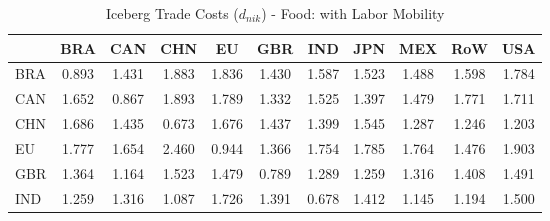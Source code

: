 \begin{table}[htbp]
\centering
\caption{Iceberg Trade Costs ($d_{nik}$) - Food: with Labor Mobility} 
\label{tab:iceberg_Food}
\begin{tabular}{lcccccccccc}
  \hline
 & BRA & CAN & CHN & EU & GBR & IND & JPN & MEX & RoW & USA \\ 
  \hline
BRA & \textcolor[RGB]{235,152,20}{0.893} & \textcolor[RGB]{150,97,105}{1.431} & \textcolor[RGB]{18,12,237}{1.883} & \textcolor[RGB]{23,15,232}{1.836} & \textcolor[RGB]{153,99,102}{1.430} & \textcolor[RGB]{82,53,173}{1.587} & \textcolor[RGB]{99,64,156}{1.523} & \textcolor[RGB]{120,78,135}{1.488} & \textcolor[RGB]{79,51,176}{1.598} & \textcolor[RGB]{33,21,222}{1.784} \\ 
  CAN & \textcolor[RGB]{66,43,189}{1.652} & \textcolor[RGB]{240,155,15}{0.867} & \textcolor[RGB]{15,10,240}{1.893} & \textcolor[RGB]{28,18,227}{1.789} & \textcolor[RGB]{191,124,64}{1.332} & \textcolor[RGB]{97,63,158}{1.525} & \textcolor[RGB]{171,111,84}{1.397} & \textcolor[RGB]{125,81,130}{1.479} & \textcolor[RGB]{38,25,217}{1.771} & \textcolor[RGB]{51,33,204}{1.711} \\ 
  CHN & \textcolor[RGB]{54,35,201}{1.686} & \textcolor[RGB]{148,96,107}{1.435} & \textcolor[RGB]{252,163,3}{0.673} & \textcolor[RGB]{61,40,194}{1.676} & \textcolor[RGB]{145,94,110}{1.437} & \textcolor[RGB]{166,107,89}{1.399} & \textcolor[RGB]{94,61,161}{1.545} & \textcolor[RGB]{207,134,48}{1.287} & \textcolor[RGB]{214,139,41}{1.246} & \textcolor[RGB]{217,140,38}{1.203} \\ 
  EU & \textcolor[RGB]{36,23,219}{1.777} & \textcolor[RGB]{64,41,191}{1.654} & \textcolor[RGB]{0,0,255}{2.460} & \textcolor[RGB]{230,148,26}{0.944} & \textcolor[RGB]{178,115,76}{1.366} & \textcolor[RGB]{43,28,212}{1.754} & \textcolor[RGB]{31,20,224}{1.785} & \textcolor[RGB]{41,26,214}{1.764} & \textcolor[RGB]{130,84,125}{1.476} & \textcolor[RGB]{13,8,242}{1.903} \\ 
  GBR & \textcolor[RGB]{181,117,74}{1.364} & \textcolor[RGB]{222,144,33}{1.164} & \textcolor[RGB]{102,66,153}{1.523} & \textcolor[RGB]{128,82,128}{1.479} & \textcolor[RGB]{245,158,10}{0.789} & \textcolor[RGB]{204,132,51}{1.289} & \textcolor[RGB]{209,135,46}{1.259} & \textcolor[RGB]{196,127,59}{1.316} & \textcolor[RGB]{163,106,92}{1.408} & \textcolor[RGB]{117,76,138}{1.491} \\ 
  IND & \textcolor[RGB]{212,137,43}{1.259} & \textcolor[RGB]{199,129,56}{1.316} & \textcolor[RGB]{227,147,28}{1.087} & \textcolor[RGB]{48,31,207}{1.726} & \textcolor[RGB]{173,112,82}{1.391} & \textcolor[RGB]{250,162,5}{0.678} & \textcolor[RGB]{161,104,94}{1.412} & \textcolor[RGB]{224,145,31}{1.145} & \textcolor[RGB]{219,142,36}{1.194} & \textcolor[RGB]{115,74,140}{1.500} \\ 

\end{tabular}
\end{table}
